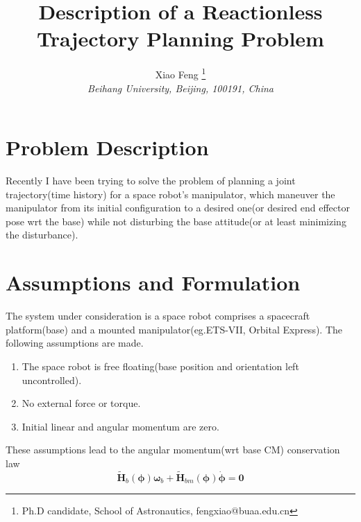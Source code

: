 \documentclass{article}
\title{Description of a Reactionless Trajectory Planning Problem}
\author{
	Xiao Feng
	\thanks{Ph.D candidate, School of Astronautics, fengxiao@buaa.edu.cn}\\
	{\normalsize\itshape
		Beihang University, Beijing, 100191, China}\\
}
\begin{document}
	\maketitle

\section{Problem Description}
Recently I have been trying to solve the problem of planning a joint trajectory(time history) for a space robot's manipulator, which maneuver the manipulator from its initial configuration to a desired one(or desired end effector pose wrt the base) while not disturbing the base attitude(or at least minimizing the disturbance).
\section{Assumptions and Formulation}
The system under consideration is a space robot comprises a spacecraft platform(base) and a mounted manipulator(eg.ETS-VII, Orbital Express). The following assumptions are made.
\begin{enumerate}
	\item The space robot is free floating(base position and orientation left uncontrolled).
	\item No external force or torque.
	\item Initial linear and angular momentum are zero.
\end{enumerate}
These assumptions lead to the angular momentum(wrt base CM) conservation law
\begin{equation}
\tilde{\bm{H}}_b(\bm{\phi})\bm{\omega}_b + \tilde{\bm{H}}_{bm}(\bm{\phi})\dot{\bm{\phi}} = \bm{0}
\end{equation} 
 
\end{document}
